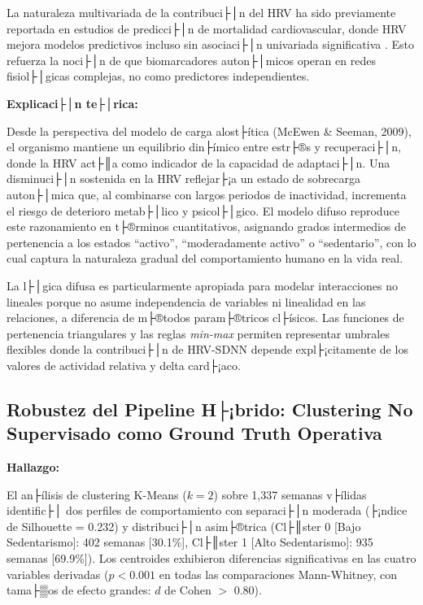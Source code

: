 La naturaleza multivariada de la contribuci├│n del HRV ha sido previamente reportada en estudios de predicci├│n de mortalidad cardiovascular, donde HRV mejora modelos predictivos incluso sin asociaci├│n univariada significativa \cite{Thayer2010MetaAnalysisHRV}. Esto refuerza la noci├│n de que biomarcadores auton├│micos operan en redes fisiol├│gicas complejas, no como predictores independientes.

\textbf{Explicaci├│n te├│rica:}

Desde la perspectiva del modelo de carga alost├ítica (McEwen \& Seeman, 2009), el organismo mantiene un equilibrio din├ímico entre estr├®s y recuperaci├│n, donde la HRV act├║a como indicador de la capacidad de adaptaci├│n. Una disminuci├│n sostenida en la HRV reflejar├¡a un estado de sobrecarga auton├│mica que, al combinarse con largos periodos de inactividad, incrementa el riesgo de deterioro metab├│lico y psicol├│gico. El modelo difuso reproduce este razonamiento en t├®rminos cuantitativos, asignando grados intermedios de pertenencia a los estados ``activo'', ``moderadamente activo'' o ``sedentario'', con lo cual captura la naturaleza gradual del comportamiento humano en la vida real.

La l├│gica difusa es particularmente apropiada para modelar interacciones no lineales porque no asume independencia de variables ni linealidad en las relaciones, a diferencia de m├®todos param├®tricos cl├ísicos. Las funciones de pertenencia triangulares y las reglas \textit{min-max} permiten representar umbrales flexibles donde la contribuci├│n de HRV-SDNN depende expl├¡citamente de los valores de actividad relativa y delta card├¡aco.


\subsection{Robustez del Pipeline H├¡brido: Clustering No Supervisado como Ground Truth Operativa}
\label{subsec:discusion_clustering_groundtruth}

\textbf{Hallazgo:}

El an├ílisis de clustering K-Means ($k=2$) sobre 1,337 semanas v├ílidas identific├│ dos perfiles de comportamiento con separaci├│n moderada (├¡ndice de Silhouette = 0.232) y distribuci├│n asim├®trica (Cl├║ster 0 [Bajo Sedentarismo]: 402 semanas [30.1\%], Cl├║ster 1 [Alto Sedentarismo]: 935 semanas [69.9\%]). Los centroides exhibieron diferencias significativas en las cuatro variables derivadas ($p < 0.001$ en todas las comparaciones Mann-Whitney, con tama├▒os de efecto grandes: $d$ de Cohen $>$ 0.80).

